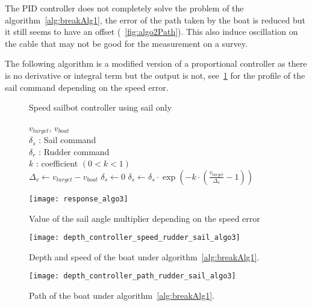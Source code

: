 The PID controller does not completely solve the problem of the algorithm~\ref{alg:breakAlg1}, the error of the path taken by the boat is reduced but it still seems to have an offset (~\ref{fig:algo2Path}). This also induce oscillation on the cable that may not be good for the measurement on a survey.

The following algorithm is a modified version of a proportional controller as there is no derivative or integral term but the output is not, see~\ref{fig:responAlgo3} for the profile of the sail command depending on the speed error.

\begin{figure}[H]
\centering
    \begin{minipage}[b]{0.4\textwidth}
    \begin{algorithm}[H]
\caption{Speed sailbot controller using sail only}
\label{alg:breakAlg3}
\begin{algorithmic}[1]
\REQUIRE $v_{target}$, $v_{boat}$\\
   $\delta_s$ : Sail command\\
   $\delta_r$ : Rudder command\\
   $k$ : coefficient $(0< k <1)$\\
\STATE $\Delta_{v} \leftarrow v_{target} - v_{boat}$
\STATE $\delta_s \leftarrow 0$
\ELSE
\STATE $\delta_s \leftarrow \delta_s \cdot  \exp(-k \cdot (\frac{v_{target}}{\Delta_v}-1)) $
\ENDIF
\end{algorithmic}
\end{algorithm}
    \end{minipage}
    \hfill
    \begin{minipage}[b]{0.45\textwidth}
    \centering
    \texttt{[image: response\_algo3]}
    \caption{Value of the sail angle multiplier depending on the speed error }
    \label{fig:responAlgo3}
    \end{minipage}
\end{figure}




\begin{figure}[H]
\centering
    \begin{minipage}[b]{0.4\textwidth}
    \centering
    \texttt{[image: depth\_controller\_speed\_rudder\_sail\_algo3]}
    \caption{Depth and speed of the boat under algorithm~\ref{alg:breakAlg1}.}
    \label{fig: algo3Depth}
    \end{minipage}
    \hfill
    \begin{minipage}[b]{0.45\textwidth}
    \centering
    \texttt{[image: depth\_controller\_path\_rudder\_sail\_algo3]}
    \caption{Path of the boat under algorithm~\ref{alg:breakAlg1}.}
    \label{fig:algo3Path}
    \end{minipage}
\end{figure}

